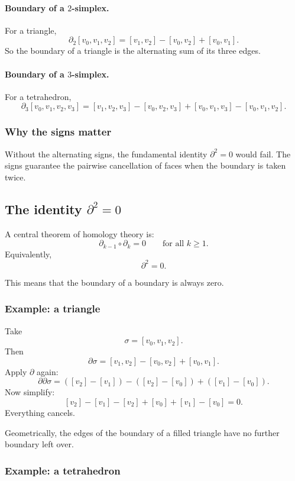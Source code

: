 \documentclass[12pt,a4paper]{article}
\theoremstyle{notespace}
\begin{document}
\paragraph{Boundary of a \(2\)-simplex.}
For a triangle,
\[
\partial_2[v_0,v_1,v_2]
=
[v_1,v_2]-[v_0,v_2]+[v_0,v_1].
\]
So the boundary of a triangle is the alternating sum of its three edges.

\paragraph{Boundary of a \(3\)-simplex.}
For a tetrahedron,
\[
\partial_3[v_0,v_1,v_2,v_3]
=
[v_1,v_2,v_3]
-
[v_0,v_2,v_3]
+
[v_0,v_1,v_3]
-
[v_0,v_1,v_2].
\]

\subsubsection{Why the signs matter}

Without the alternating signs, the fundamental identity \(\partial^2=0\) would fail. The signs guarantee the pairwise cancellation of faces when the boundary is taken twice.

\subsection{The identity \texorpdfstring{$\partial^2=0$}{d squared = 0}}

A central theorem of homology theory is:
\[
\partial_{k-1}\circ \partial_k = 0
\qquad \text{for all } k\ge 1.
\]
Equivalently,
\[
\partial^2=0.
\]

This means that the boundary of a boundary is always zero.

\subsubsection{Example: a triangle}

Take
\[
\sigma=[v_0,v_1,v_2].
\]
Then
\[
\partial \sigma
=
[v_1,v_2]-[v_0,v_2]+[v_0,v_1].
\]
Apply \(\partial\) again:
\[
\partial\partial \sigma
=
([v_2]-[v_1]) - ([v_2]-[v_0]) + ([v_1]-[v_0]).
\]
Now simplify:
\[
[v_2]-[v_1]-[v_2]+[v_0]+[v_1]-[v_0]=0.
\]
Everything cancels.

Geometrically, the edges of the boundary of a filled triangle have no further boundary left over.

\subsubsection{Example: a tetrahedron}
\end{document}
